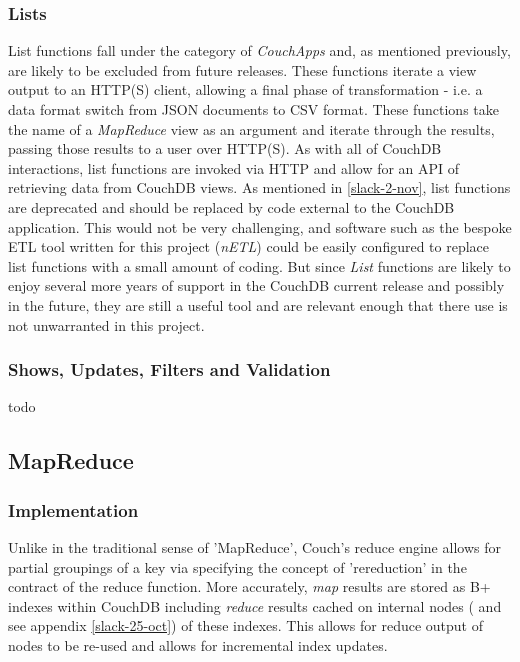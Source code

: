 \subsubsection{Lists}
List functions fall under the category of \textit{CouchApps} and, as mentioned previously, are likely to be excluded from future releases. These functions iterate a view output to an HTTP(S) client, allowing a final phase of transformation - i.e. a data format switch from JSON documents to CSV format. These  functions take the name of a \textit{MapReduce} view as an argument and iterate through the results, passing those results to a user over HTTP(S). As with all of CouchDB interactions, list functions are invoked via HTTP and allow for an API of retrieving data from CouchDB views. As mentioned in \ref{slack-2-nov}, list functions are deprecated and should be replaced by code external to the CouchDB application. This would not be very challenging, and software such as the bespoke ETL tool written for this project (\textit{nETL}) could be easily configured to replace list functions with a small amount of coding. But since \textit{List} functions are likely to enjoy several more years of support in the CouchDB current release and possibly in the future, they are still a useful tool and are relevant enough that there use is not unwarranted in this project.

\subsubsection{Shows, Updates, Filters and Validation}
todo


\subsection{MapReduce}

\subsubsection{Implementation}
Unlike in the traditional sense of 'MapReduce', Couch's reduce engine allows for partial groupings of a key via specifying the concept of 'rereduction' in the contract of the reduce function. More accurately, \textit{map} results are stored as B+ indexes within CouchDB including \textit{reduce} results cached on internal nodes (\cite{reduceFunctions} and see appendix \ref{slack-25-oct}) of these indexes. This allows for reduce output of nodes to be re-used and allows for incremental index updates.

